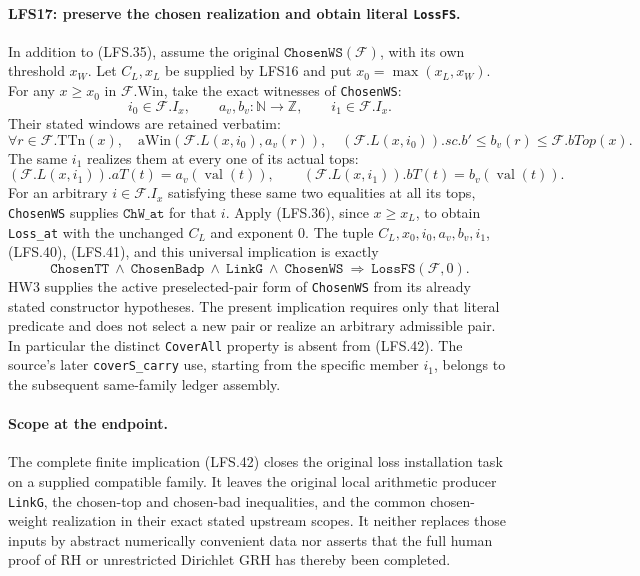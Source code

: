 \paragraph{LFS17: preserve the chosen realization and obtain literal \texttt{LossFS}.}
\label{claim:LFS17}
In addition to (LFS.35), assume the original
$\texttt{ChosenWS}(\mathcal F)$, with its own threshold $x_W$.
Let $C_L,x_L$ be supplied by LFS16 and put
$x_0=\max(x_L,x_W)$.  For any $x\ge x_0$ in
$\mathcal F.\mathrm{Win}$, take the exact witnesses of
\texttt{ChosenWS}:
\[
 i_0\in\mathcal F.I_x,\qquad
 a_v,b_v:\mathbb N\longrightarrow\mathbb Z,
 \qquad i_1\in\mathcal F.I_x.                              \tag{LFS.39}
\]
Their stated windows are retained verbatim:
\[
 \forall r\in\mathcal F.\mathrm{TTn}(x),\quad
 \mathrm{aWin}(\mathcal F.L(x,i_0),a_v(r)),\quad
 (\mathcal F.L(x,i_0)).sc.b'\le b_v(r)\le\mathcal F.bTop(x).
                                                               \tag{LFS.40}
\]
The same $i_1$ realizes them at every one of its actual tops:
\[
 (\mathcal F.L(x,i_1)).aT(t)=a_v(\operatorname{val}(t)),\qquad
 (\mathcal F.L(x,i_1)).bT(t)=b_v(\operatorname{val}(t)).         \tag{LFS.41}
\]
For an arbitrary $i\in\mathcal F.I_x$ satisfying these same
two equalities at all its tops, \texttt{ChosenWS} supplies
$\texttt{ChW\_at}$ for that $i$.  Apply (LFS.36), since
$x\ge x_L$, to obtain \texttt{Loss\_at} with the unchanged
$C_L$ and exponent $0$.
The tuple $C_L,x_0,i_0,a_v,b_v,i_1$, (LFS.40), (LFS.41),
and this universal implication is exactly
\[
 \boxed{\quad
 \texttt{ChosenTT}\ \wedge\ \texttt{ChosenBadp}\ \wedge\
 \texttt{LinkG}\ \wedge\ \texttt{ChosenWS}
       \ \Longrightarrow\ \texttt{LossFS}(\mathcal F,0).
 \quad}                                                       \tag{LFS.42}
\]
HW3 supplies the active preselected-pair form of
\texttt{ChosenWS} from its already stated constructor
hypotheses.  The present implication requires only that
literal predicate and does not select a new pair or realize
an arbitrary admissible pair.  In particular the distinct
\texttt{CoverAll} property is absent from (LFS.42).
The source's later \texttt{coverS\_carry} use, starting from
the specific member $i_1$, belongs to the subsequent
same-family ledger assembly.

\paragraph{Scope at the endpoint.}
The complete finite implication (LFS.42) closes the original
loss installation task on a supplied compatible family.
It leaves the original local arithmetic producer
\texttt{LinkG}, the chosen-top and chosen-bad inequalities,
and the common chosen-weight realization in their exact
stated upstream scopes.  It neither replaces those inputs
by abstract numerically convenient data nor asserts that
the full human proof of RH or unrestricted Dirichlet GRH
has thereby been completed.
